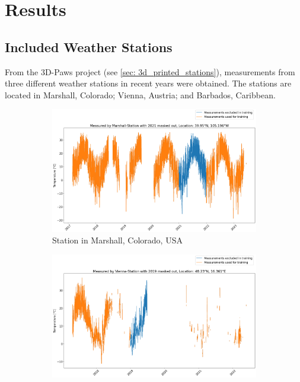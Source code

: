 \section{Results}
\label{sec: results}

\subsection{Included Weather Stations}

From the 3D-Paws project (see \autoref{sec: 3d_printed_stations}), measurements from three different weather stations in recent years were obtained. The stations are located in Marshall, Colorado; Vienna, Austria; and Barbados, Caribbean.

\begin{figure}
\centering
\begin{subfigure}{0.672\textwidth}
\includegraphics[width=\textwidth]{resources/images/charts/marshall_available_measurements.png}
\caption{Station in Marshall, Colorado, USA}
\label{fig: available_measurements_marshall}
\end{subfigure}
\begin{subfigure}{0.672\textwidth}
\includegraphics[width=\textwidth]{resources/images/charts/vienna_available_measurements.png}

\end{subfigure}
\end{figure}

